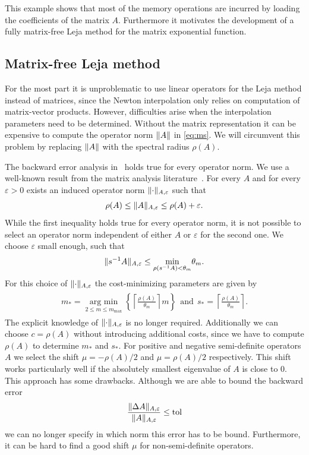 \documentclass{scrartcl}
\begin{document}
	This example shows that most of the memory operations are incurred by loading the coefficients of the matrix $A$. Furthermore it motivates the development of a fully matrix-free Leja method for the matrix exponential function. 


\subsection{Matrix-free Leja method} \label{sec:MatrixFreeLejaMethod}
	For the most part it is unproblematic to use linear operators for the Leja method instead of matrices, since the Newton interpolation only relies on computation of matrix-vector products. However, difficulties arise when the interpolation parameters need to be determined. Without the matrix representation it can be expensive to compute the operator norm $\lVert A\rVert$ in \eqref{eq:ms}. We will circumvent this problem by replacing $\lVert A\rVert$ with the spectral radius $\rho(A)$. 
	
	The backward error analysis in~\cite{lejarev} holds true for every operator norm.
	We use a well-known result from the matrix analysis literature~\cite[Lemma 5.6.10.]{matrixanalysis}. For every $A$ and for every $\varepsilon>0$ exists an induced operator norm $\lVert\cdot\rVert_{A,\varepsilon}$ such that
	\[
	\rho(A) \le \lVert A\rVert_{A,\varepsilon} \le \rho(A) + \varepsilon. 
	\]
	While the first inequality holds true for every operator norm, it is not possible to select an operator norm independent of either $A$ or $\varepsilon$ for the second one. We choose $\varepsilon$ small enough, such that
	\[
	\lVert s^{-1}A\rVert_{A,\varepsilon} \le \underset{\rho(s^{-1}A) < \theta_m}{\min}\theta_m.
	\]
	For this choice of $\lVert\cdot\rVert_{A,\varepsilon}$ the cost-minimizing parameters are given by
	\begin{align}
	\begin{split}
		m_* = \underset{2\le m\le m_{\operatorname{max}}}{\operatorname{arg\ min}}  \left\{{\left\lceil{\frac{\rho(A)}{\theta_m}}\right\rceil}m\right\} ~~\text{and}~~
		s_* =  \left\lceil{\frac{\rho(A)}{\theta_m}}\right\rceil.
	\end{split}\label{eq:msmatrixfree}
	\end{align}
	The explicit knowledge of $\lVert\cdot\rVert_{A,\varepsilon}$ is no longer required. Additionally we can choose $c=\rho(A)$ without introducing additional costs, since we have to compute $\rho(A)$ to determine $m_*$ and $s_*$. 
	For positive and negative semi-definite operators $A$ we select the shift $\mu = -\rho(A)/2$ and $\mu = \rho(A)/2$ respectively. This shift works particularly well if the absolutely smallest eigenvalue of $A$ is close to $0$.\\
	This approach has some drawbacks. Although we are able to bound the backward error
	\[
		\frac{\lVert\Delta A\rVert_{A,\varepsilon}}{\lVert A\rVert_{A,\varepsilon}} \le \operatorname{tol}  
	\]
	we can no longer specify in which norm this error has to be bound. Furthermore, it can be hard to find a good shift $\mu$ for non-semi-definite operators.
\end{document}
